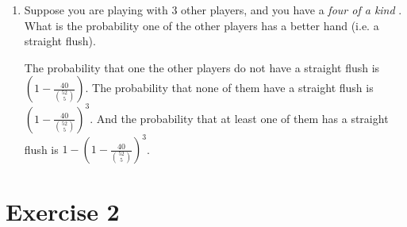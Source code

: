 \documentclass[12pt, a4paper]{article} %
\begin{document}
\begin{enumerate}[label=( \alph*)]
\begin{enumerate}[label=\textbullet]
    \end{enumerate}
  \item Suppose you are playing with 3 other players, and you have a \textit{four of a kind} . What is the probability one of the other players has a better hand (i.e. a straight flush).

    The probability that one the other players do not have a straight flush is $(1 - \frac{40}{\binom{52}{5}})$. The probability that none of them have a straight flush is $(1 - \frac{40}{\binom{52}{5}})^3$. And the probability that at least one of them has a straight flush is $1 - (1 - \frac{40}{\binom{52}{5}})^3$.




\end{enumerate}



\section*{Exercise 2}%
\label{sec:exercise_2}
\end{document}
